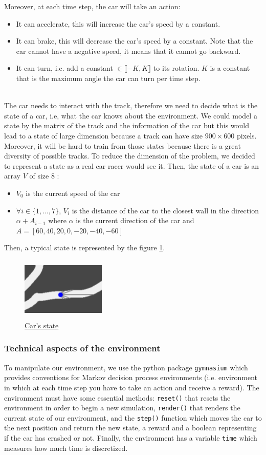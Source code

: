 \documentclass[11pt,a4paper]{article}
\newcounter{fig}
\newcommand{\tab}{\phantom{xxx}}
\newcommand{\mlist}[1]{\begin{itemize}[noitemsep,topsep=0pt]#1\end{itemize}}
\begin{document}
Moreover, at each time step, the car will take an action:
\mlist{
\item It can accelerate, this will increase the car's speed by a constant.
\item It can brake, this will decrease the car's speed by a constant. Note that the car cannot have a negative speed, it means that it cannot go backward.
\item It can turn, i.e. add a constant $\in \llbracket-K,K\rrbracket$ to its rotation. $K$ is a constant that is the maximum angle the car can turn per time step.
}
\tab \\
The car needs to interact with the track, therefore we need to decide what is the state of a car, i.e, what the car knows about the environment. 
We could model a state by the matrix of the track and the information of the car but this would lead to a state of large dimension because a track can have size $900\times600$ pixels. Moreover, it will be hard to train from those states because there is a great diversity of possible tracks. 
To reduce the dimension of the problem, we decided to represent a state as a real car racer would see it. Then, the state of a car is an array $V$ of size $8$ : 
\mlist{
\item $V_0$ is the current speed of the car
\item $\forall i\in\{1,...,7\}$, $V_i$ is the distance of the car to the closest wall in the direction $\alpha + A_{i-1}$ where $\alpha$ is the current direction of the car and $A=[60, 40, 20, 0, -20, -40, -60]$
}
Then, a typical state is represented by the figure \ref{figure:car state}.
\begin{center}
	\begin{figure}[ht]
		\centering
		\includegraphics[width=4cm, height=3cm]{car_state.png}
		\caption{\underline{Car's state}}
		\label{figure:car state}
	\end{figure}
\end{center}
		
			\subsubsection*{Technical aspects of the environment}
To manipulate our environment, we use the python package \texttt{gymnasium} which provides conventions for Markov decision process environments (i.e. environment in which at each time step you have to take an action and receive a reward). 
The environment must have some essential methods: \texttt{reset()} that resets the environment in order to begin a new simulation, \texttt{render()} that renders the current state of our environment, 
and the \texttt{step()} function which moves the car to the next position and return the new state, a reward and a boolean representing if the car has crashed or not.
Finally, the environment has a variable \texttt{time} which measures how much time is discretized.
		
\end{document}

